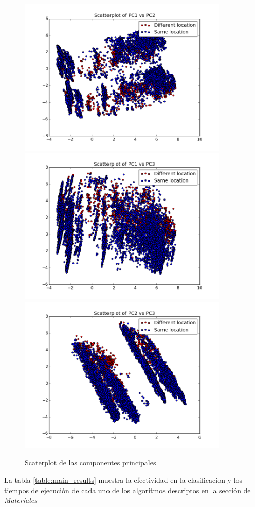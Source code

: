 \documentclass[journal]{IEEEtran}
\begin{document}
\begin{figure}[!ht]
\label{fig:pca_scatterplot}
\caption{Scaterplot de las componentes principales}
\centering
\includegraphics[width=10cm,keepaspectratio]{pca1_vs_pca2.png}
\includegraphics[width=10cm,keepaspectratio]{pca1_vs_pca3.png}
\includegraphics[width=10cm,keepaspectratio]{pca2_vs_pca3.png}
\end{figure}


La tabla \ref{table:main_results} muestra la efectividad en la clasificacion
y los tiempos de ejecución de cada uno de los algoritmos descriptos en
la sección de \textit{Materiales}
\end{document}

